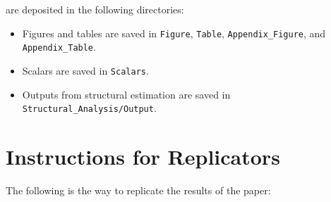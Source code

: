\documentclass[12pt,notitlepage]{article}
\begin{document}
 are deposited in the following directories: 
\begin{itemize}
\item Figures and tables are saved in \texttt{Figure}, \texttt{Table}, \texttt{Appendix\_Figure}, and \texttt{Appendix\_Table}.
\item Scalars are saved in \texttt{Scalars}.
\item Outputs from structural estimation are saved in \texttt{Structural\_Analysis/Output}.
\end{itemize}

\section{Instructions for Replicators} 

The following is the way to replicate the results of the paper:
\end{document}
